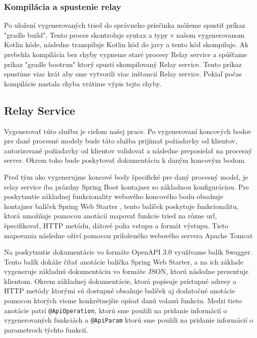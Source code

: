 \subsubsection{Kompilácia a spustenie relay}

Po uložení vygenerovaných tried do správneho priečinka môžeme spustiť príkaz "gradle build". Tento proces skontroluje syntax a typy v našom vygenerovanom Kotlin kóde, následne transpiluje Kotlin kód do javy a tento kód skompiluje. Ak prebehla kompilácia bez chyby vypneme staré procesy Relay service a spúšťame príkaz "gradle bootrun" ktorý spustí skompilovaný Relay service. Tento príkaz spustíme viac krát aby sme vytvorili viac inštancií Relay service. Pokiaľ počas kompilácie nastala chyba vrátime výpis tejto chyby.

\subsection{Relay Service}

Vygenerovať túto službu je cieľom našej prace. Po vygenerovaní koncových bodov pre dané procesné modely bude táto služba prijímať požiadavky od klientov, autorizované požiadavky od klientov validovať a následne preposielať na procesný server. Okrem toho bude poskytovať dokumentáciu k daným koncovým bodom.

Pred tým ako vygenerujme koncové body špecifické pre daný procesný model, je relay service iba prázdny Spring Boot kontajner so základnou konfiguráciou. Pre poskytnutie základnej funkcionality webového koncového bodu obsahuje kontajner balíček Spring Web Starter \cite{webstarter}, tento balíček poskytuje funkcionalitu, ktorá umožňuje pomocou anotácií mapovať funkcie tried na rôzne \acrshort{url}, špecifikovať, HTTP metódu, dátové polia vstupu a formát výstupu. Tieto mapovania následne oživí pomocou priloženého webového servera Apache Tomcat \cite{tomcat}


Na poskytnutie dokumentácie vo formáte OpenAPI 3.0 \cite{openapi} využívame balík Swagger. Tento balík dokáže čítať anotácie balíčka Spring Web Starter, a na ich základe vygeneruje základnú dokumentáciu vo formáte JSON, ktorú následne prezentuje klientom. Okrem základnej dokumentácie, ktorá popisuje prístupné adresy a HTTP metódy ktorými sú dostupné obsahuje balíček aj dodatočné anotácie pomocou ktorých vieme konkrétnejšie opísať danú volanú funkciu. Medzi tieto anotácie patrí \texttt{@ApiOperation}, ktorú sme použili na pridanie informácií o vygenerovaných funkciách a \texttt{@ApiParam} ktorú sme použili na pridanie informácií o parametroch týchto funkcií.

